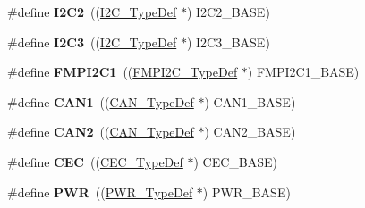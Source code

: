 \begin{DoxyCompactItemize}
\item 
\#define {\bfseries I2\+C2}~((\hyperlink{struct_i2_c___type_def}{I2\+C\+\_\+\+Type\+Def} $\ast$) I2\+C2\+\_\+\+B\+A\+SE)\hypertarget{group___peripheral__declaration_gafa60ac20c1921ef1002083bb3e1f5d16}{}\label{group___peripheral__declaration_gafa60ac20c1921ef1002083bb3e1f5d16}

\item 
\#define {\bfseries I2\+C3}~((\hyperlink{struct_i2_c___type_def}{I2\+C\+\_\+\+Type\+Def} $\ast$) I2\+C3\+\_\+\+B\+A\+SE)\hypertarget{group___peripheral__declaration_ga1489b37ed2bca9d9c659119590583bda}{}\label{group___peripheral__declaration_ga1489b37ed2bca9d9c659119590583bda}

\item 
\#define {\bfseries F\+M\+P\+I2\+C1}~((\hyperlink{struct_f_m_p_i2_c___type_def}{F\+M\+P\+I2\+C\+\_\+\+Type\+Def} $\ast$) F\+M\+P\+I2\+C1\+\_\+\+B\+A\+SE)\hypertarget{group___peripheral__declaration_ga32deee9288df620dee74fe3c0cfff3b3}{}\label{group___peripheral__declaration_ga32deee9288df620dee74fe3c0cfff3b3}

\item 
\#define {\bfseries C\+A\+N1}~((\hyperlink{struct_c_a_n___type_def}{C\+A\+N\+\_\+\+Type\+Def} $\ast$) C\+A\+N1\+\_\+\+B\+A\+SE)\hypertarget{group___peripheral__declaration_ga4964ecb6a5c689aaf8ee2832b8093aac}{}\label{group___peripheral__declaration_ga4964ecb6a5c689aaf8ee2832b8093aac}

\item 
\#define {\bfseries C\+A\+N2}~((\hyperlink{struct_c_a_n___type_def}{C\+A\+N\+\_\+\+Type\+Def} $\ast$) C\+A\+N2\+\_\+\+B\+A\+SE)\hypertarget{group___peripheral__declaration_gac5e4c86ed487dc91418b156e24808033}{}\label{group___peripheral__declaration_gac5e4c86ed487dc91418b156e24808033}

\item 
\#define {\bfseries C\+EC}~((\hyperlink{struct_c_e_c___type_def}{C\+E\+C\+\_\+\+Type\+Def} $\ast$) C\+E\+C\+\_\+\+B\+A\+SE)\hypertarget{group___peripheral__declaration_ga7d03f4d873d59ff8bc76b6c9b576f3e3}{}\label{group___peripheral__declaration_ga7d03f4d873d59ff8bc76b6c9b576f3e3}

\item 
\#define {\bfseries P\+WR}~((\hyperlink{struct_p_w_r___type_def}{P\+W\+R\+\_\+\+Type\+Def} $\ast$) P\+W\+R\+\_\+\+B\+A\+SE)\hypertarget{group___peripheral__declaration_ga04651c526497822a859942b928e57f8e}{}\label{group___peripheral__declaration_ga04651c526497822a859942b928e57f8e}


\end{DoxyCompactItemize}
